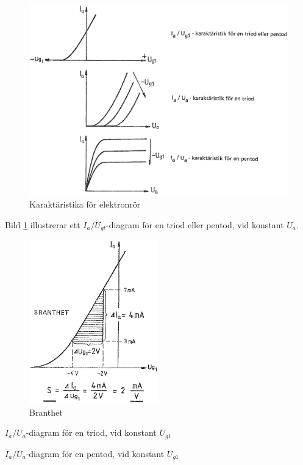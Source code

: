 \begin{figure}
\includegraphics[width=\textwidth]{images/cropped_pdfs/bild_2_2-32.pdf}
\caption{Karaktäristika för elektronrör}
\label{fig:BildII2-32}
\end{figure}

Bild \ref{fig:BildII2-32} illustrerar ett \(I_a/U_{gt}\)-diagram för en triod
eller pentod, vid konstant \(U_a\).

\begin{figure}
\includegraphics[width=0.5\textwidth]{images/cropped_pdfs/bild_2_2-33.pdf}
\caption{Branthet}
\label{fig:BildII2-33}
\end{figure}

\(I_a/U_a\)-diagram för en triod, vid konstant \(U_{g1}\)

\(I_a/U_a\)-diagram för en pentod, vid konstant \(U_{g1}\)

